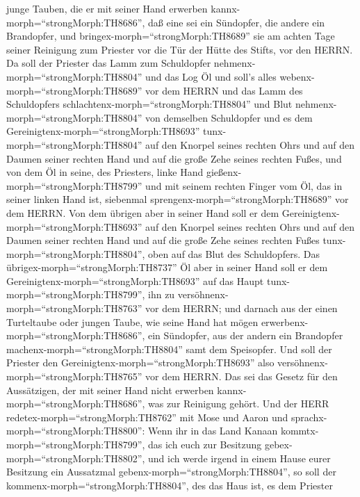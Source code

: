 junge Tauben, die er mit seiner Hand erwerben
kannx-morph=``strongMorph:TH8686'', daß eine sei ein Sündopfer, die
andere ein Brandopfer,  und
bringex-morph=``strongMorph:TH8689'' sie am achten Tage seiner Reinigung
zum Priester vor die Tür der Hütte des Stifts, vor den HERRN.
 Da soll der Priester das Lamm zum Schuldopfer
nehmenx-morph=``strongMorph:TH8804'' und das Log Öl und soll's alles
webenx-morph=``strongMorph:TH8689'' vor dem HERRN  und das
Lamm des Schuldopfers schlachtenx-morph=``strongMorph:TH8804'' und Blut
nehmenx-morph=``strongMorph:TH8804'' von demselben Schuldopfer und es
dem Gereinigtenx-morph=``strongMorph:TH8693''
tunx-morph=``strongMorph:TH8804'' auf den Knorpel seines rechten Ohrs
und auf den Daumen seiner rechten Hand und auf die große Zehe seines
rechten Fußes,  und von dem Öl in seine, des Priesters,
linke Hand gießenx-morph=``strongMorph:TH8799''  und mit
seinem rechten Finger vom Öl, das in seiner linken Hand ist, siebenmal
sprengenx-morph=``strongMorph:TH8689'' vor dem HERRN.  Von
dem übrigen aber in seiner Hand soll er dem
Gereinigtenx-morph=``strongMorph:TH8693'' auf den Knorpel seines rechten
Ohrs und auf den Daumen seiner rechten Hand und auf die große Zehe
seines rechten Fußes tunx-morph=``strongMorph:TH8804'', oben auf das
Blut des Schuldopfers.  Das
übrigex-morph=``strongMorph:TH8737'' Öl aber in seiner Hand soll er dem
Gereinigtenx-morph=``strongMorph:TH8693'' auf das Haupt
tunx-morph=``strongMorph:TH8799'', ihn zu
versöhnenx-morph=``strongMorph:TH8763'' vor dem HERRN;  und
darnach aus der einen Turteltaube oder jungen Taube, wie seine Hand hat
mögen erwerbenx-morph=``strongMorph:TH8686'',  ein
Sündopfer, aus der andern ein Brandopfer
machenx-morph=``strongMorph:TH8804'' samt dem Speisopfer. Und soll der
Priester den Gereinigtenx-morph=``strongMorph:TH8693'' also
versöhnenx-morph=``strongMorph:TH8765'' vor dem HERRN.  Das
sei das Gesetz für den Aussätzigen, der mit seiner Hand nicht erwerben
kannx-morph=``strongMorph:TH8686'', was zur Reinigung gehört.
 Und der HERR redetex-morph=``strongMorph:TH8762'' mit Mose
und Aaron und sprachx-morph=``strongMorph:TH8800'':  Wenn
ihr in das Land Kanaan kommtx-morph=``strongMorph:TH8799'', das ich euch
zur Besitzung gebex-morph=``strongMorph:TH8802'', und ich werde irgend
in einem Hause eurer Besitzung ein Aussatzmal
gebenx-morph=``strongMorph:TH8804'',  so soll der
kommenx-morph=``strongMorph:TH8804'', des das Haus ist, es dem Priester
